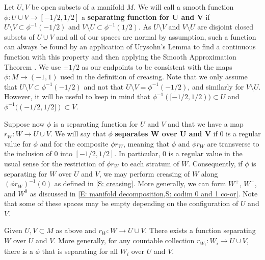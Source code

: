 \begin{definition}\label{D: separating function}
	Let $U,V$ be open subsets of a manifold $M$.
	We will call a smooth function $\phi \colon U \cup V \to [-1/2,1/2]$ a \textbf{separating function for $\mathbf U$ and $\mathbf V$} if $U\setminus V \subset \phi^{-1}(-1/2)$ and $V\setminus U \subset \phi^{-1}(1/2)$.
	As $U \setminus V$ and $V \setminus U$ are disjoint closed subsets of $U \cup V$ and all of our spaces are normal by assumption, such a function can always be found by an application of Urysohn's Lemma to find a continuous function with this property and then applying the Smooth Approximation Theorem \cite[Theorem III.2.5]{Kos93}.
	We use $\pm 1/2$ as our endpoints to be consistent with the maps $\phi \colon M \to (-1,1)$ used in the definition of creasing.
	Note that we only assume that $U \setminus V \subset \phi^{-1}(-1/2)$ and not that $U \setminus V  = \phi^{-1}(-1/2)$, and similarly for $V \setminus U$.
	However, it will be useful to keep in mind that $\phi^{-1}([-1/2,1/2)) \subset U$ and $\phi^{-1}((-1/2,1/2]) \subset V$.

	Suppose now $\phi$ is a separating function for $U$ and $V$ and that we have a map $r_W \colon W \to U \cup V$.
	We will say that $\phi$ \textbf{separates $\mathbf W$ over $\mathbf U$ and $\mathbf V$} if $0$ is a regular value for $\phi$ and for the composite $\phi r_W$, meaning that $\phi$ and $\phi r_W$ are transverse to the inclusion of $0$ into $[-1/2,1/2]$.
	In particular, $0$ is a regular value in the usual sense for the restriction of $\phi r_W$ to each stratum of $W$.
	Consequently, if $\phi$ is separating for $W$ over $U$ and $V$, we may perform creasing of $W$ along $(\phi r_W)^{-1}(0)$ as defined in \cref{S: creasing}.
	More generally, we can form $W^+$, $W^-$, and $W^0$ as discussed in \cref{E: manifold decomposition,S: codim 0 and 1 co-or}.
	Note that some of these spaces may be empty depending on the configuration of $U$ and $V$.
\end{definition}

\begin{lemma}\label{L: existence of separating}
	Given $U,V \subset M$ as above and $r_W \colon W \to U \cup V$.
	There exists a function separating $W$ over $U$ and $V$.
	More generally, for any countable collection $r_{W_i} \colon W_i \to U \cup V$, there is a $\phi$ that is separating for all $W_i$ over $U$ and $V$.
\end{lemma}

